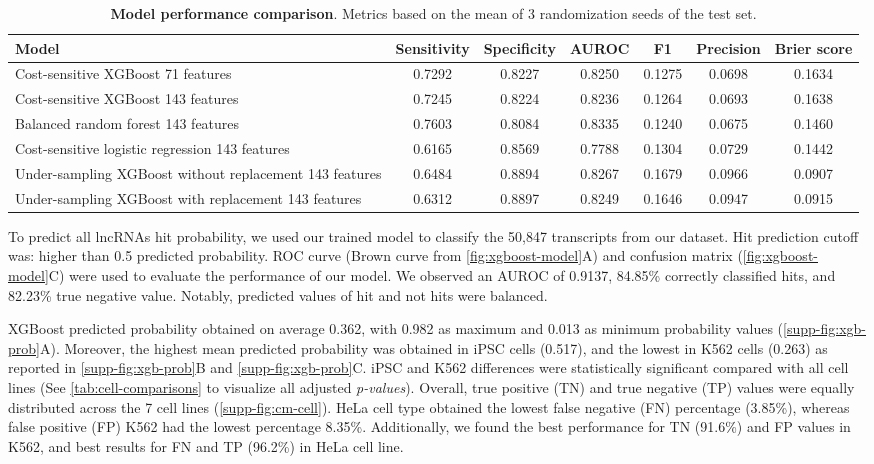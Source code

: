 \begin{table}[!htb]
  \caption[Model performance comparison]{\textbf{Model performance comparison}. Metrics based on the mean of 3 randomization seeds of the test set.}
  \begin{scriptsize}
    \begin{tabulary}{0.95\linewidth}{p{4cm}cccccc}
      \textbf{Model} & \textbf{Sensitivity} & \textbf{Specificity} & \textbf{AUROC} & \textbf{F1}  & \textbf{Precision} & \textbf{Brier score}\\ \hline
      Cost-sensitive XGBoost 71 features & 0.7292 & 0.8227 & 0.8250 & 0.1275 & 0.0698 & 0.1634  \\
      Cost-sensitive XGBoost 143 features & 0.7245 & 0.8224 & 0.8236 & 0.1264 & 0.0693 & 0.1638  \\
      Balanced random forest 143 features & 0.7603 & 0.8084 & 0.8335 & 0.1240 & 0.0675 & 0.1460  \\
      Cost-sensitive logistic regression 143 features & 0.6165 & 0.8569 & 0.7788 & 0.1304 & 0.0729 & 0.1442 \\
      Under-sampling XGBoost without replacement 143 features & 0.6484 & 0.8894 & 0.8267 & 0.1679 & 0.0966 & 0.0907 \\
      Under-sampling XGBoost with replacement 143 features & 0.6312 & 0.8897 & 0.8249 & 0.1646 & 0.0947 & 0.0915  \\
    \end{tabulary}
  \end{scriptsize}
  \label{tab:summary_table_models}
\end{table}

To predict all lncRNAs hit probability, we used our trained model to classify the 50,847 transcripts from our dataset. Hit prediction cutoff was: higher than 0.5 predicted probability. ROC curve (Brown curve from \autoref{fig:xgboost-model}A) and confusion matrix (\autoref{fig:xgboost-model}C) were used to evaluate the performance of our model. We observed an AUROC of 0.9137, 84.85\% correctly classified hits, and 82.23\% true negative value. Notably, predicted values of hit and not hits were balanced.

XGBoost predicted probability obtained on average 0.362, with 0.982 as maximum and  0.013 as minimum probability values (\autoref{supp-fig:xgb-prob}A). Moreover, the highest mean predicted probability was obtained in iPSC cells (0.517), and the lowest in K562 cells (0.263) as reported in \autoref{supp-fig:xgb-prob}B and \autoref{supp-fig:xgb-prob}C. iPSC and K562 differences were statistically significant compared with all cell lines (See \autoref{tab:cell-comparisons} to visualize all adjusted \textit{p-values}). Overall, true positive (TN) and true negative (TP) values were equally distributed across the 7 cell lines (\autoref{supp-fig:cm-cell}). HeLa cell type obtained the lowest false negative (FN) percentage (3.85\%), whereas false positive (FP) K562 had the lowest percentage 8.35\%. Additionally, we found the best performance for TN (91.6\%) and FP values in K562, and best results for FN and TP (96.2\%) in HeLa cell line. 

